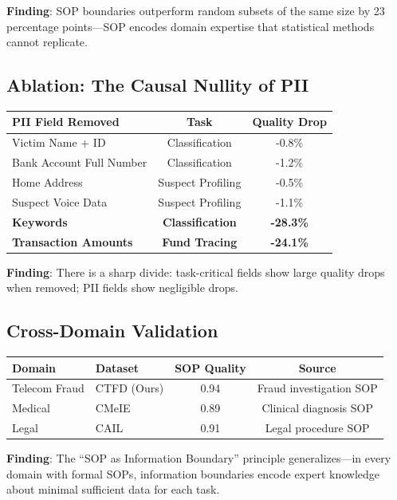 \documentclass[letterpaper]{article}
\begin{document}
\textbf{Finding}: SOP boundaries outperform random subsets of the same size by 23 percentage points---SOP encodes domain expertise that statistical methods cannot replicate.

\subsection{Ablation: The Causal Nullity of PII}

\begin{center}
\begin{tabular}{lcc}
\toprule
\textbf{PII Field Removed} & \textbf{Task} & \textbf{Quality Drop} \\
\midrule
Victim Name + ID & Classification & -0.8\% \\
Bank Account Full Number & Classification & -1.2\% \\
Home Address & Suspect Profiling & -0.5\% \\
Suspect Voice Data & Suspect Profiling & -1.1\% \\
\textbf{Keywords} & \textbf{Classification} & \textbf{-28.3\%} \\
\textbf{Transaction Amounts} & \textbf{Fund Tracing} & \textbf{-24.1\%} \\
\bottomrule
\end{tabular}
\end{center}

\textbf{Finding}: There is a sharp divide: task-critical fields show large quality drops when removed; PII fields show negligible drops.

\subsection{Cross-Domain Validation}

\begin{center}
\begin{tabular}{llcc}
\toprule
\textbf{Domain} & \textbf{Dataset} & \textbf{SOP Quality} & \textbf{Source} \\
\midrule
Telecom Fraud & CTFD (Ours) & 0.94 & Fraud investigation SOP \\
Medical & CMeIE & 0.89 & Clinical diagnosis SOP \\
Legal & CAIL & 0.91 & Legal procedure SOP \\
\bottomrule
\end{tabular}
\end{center}

\textbf{Finding}: The ``SOP as Information Boundary'' principle generalizes---in every domain with formal SOPs, information boundaries encode expert knowledge about minimal sufficient data for each task.
\end{document}
